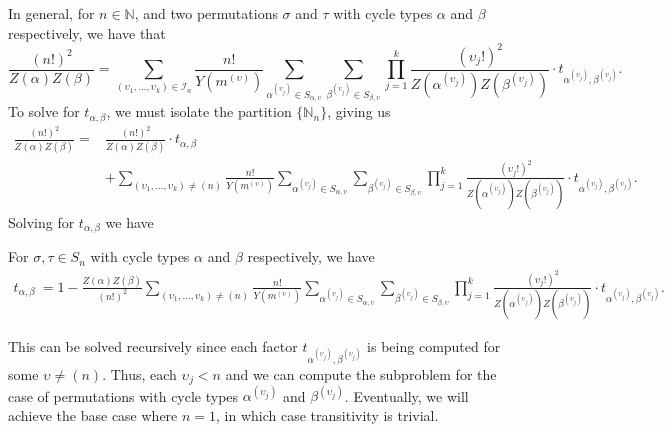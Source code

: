 In general, for $n\in\mathbb{N}$, and two permutations $\sigma$
and $\tau$ with cycle types $\alpha$ and $\beta$ respectively, we have that
\[
  \frac{(n!)^2}{Z(\alpha)Z(\beta)} =
  \sum_{(\upsilon_1,\dots,\upsilon_k)\in\mathcal{I}_n}\frac{n!}{Y(m^{(\upsilon)})}\sum_{\alpha^{(\upsilon_j)}\in
  S_{\alpha,\upsilon}}\sum_{\beta^{(\upsilon_j)}\in
  S_{\beta,\upsilon}}\prod_{j=1}^k
  {\frac{(\upsilon_j!)^2}{Z(\alpha^{(\upsilon_j)})Z(\beta^{(\upsilon_j)})}}\cdot
  t_{\alpha^{(\upsilon_j)},\beta^{(\upsilon_j)}}.
\]
To solve for $t_{\alpha,\beta}$, we must isolate the partition
$\{\mathbb{N}_n\}$, giving us
\begin{align*}
  \frac{(n!)^2}{Z(\alpha)Z(\beta)} =
  &\frac{(n!)^2}{Z(\alpha)Z(\beta)}\cdot t_{\alpha, \beta}\\
  &+
  \sum_{(\upsilon_1,\dots,\upsilon_k)\ne(n)}\frac{n!}{Y(m^{(\upsilon)})}\sum_{\alpha^{(\upsilon_j)}\in
  S_{\alpha,\upsilon}}\sum_{\beta^{(\upsilon_j)}\in
  S_{\beta,\upsilon}}\prod_{j=1}^k
  {\frac{(\upsilon_j!)^2}{Z(\alpha^{(\upsilon_j)})Z(\beta^{(\upsilon_j)})}}\cdot
  t_{\alpha^{(\upsilon_j)},\beta^{(\upsilon_j)}}.
\end{align*}
Solving for $t_{\alpha,\beta}$ we have
\begin{theorem}\label{general_dixon}
  For $\sigma,\tau\in S_n$ with cycle types $\alpha$ and $\beta$
  respectively, we have
  \begin{align*}
    t_{\alpha, \beta}\ = 1 -
    \frac{Z(\alpha)Z(\beta)}{(n!)^2}\sum_{(\upsilon_1,\dots,\upsilon_k)\ne(n)}\frac{n!}{Y(m^{(\upsilon)})}\sum_{\alpha^{(\upsilon_j)}\in
    S_{\alpha,\upsilon}}\sum_{\beta^{(\upsilon_j)}\in
    S_{\beta,\upsilon}}\prod_{j=1}^k
    {\frac{(\upsilon_j!)^2}{Z(\alpha^{(\upsilon_j)})Z(\beta^{(\upsilon_j)})}}\cdot
    t_{\alpha^{(\upsilon_j)},\beta^{(\upsilon_j)}}.
  \end{align*}
\end{theorem}
\noindent This can be solved recursively since each factor
$t_{\alpha^{(\upsilon_j)},\beta^{(\upsilon_j)}}$ is being computed for
some $\upsilon \ne (n)$. Thus, each $\upsilon_j < n$ and we can
compute the subproblem for the case of permutations with cycle types
$\alpha^{(\upsilon_j)}$ and $\beta^{(\upsilon_j)}$. Eventually, we will
achieve the base case where $n = 1$, in which case transitivity is trivial.
